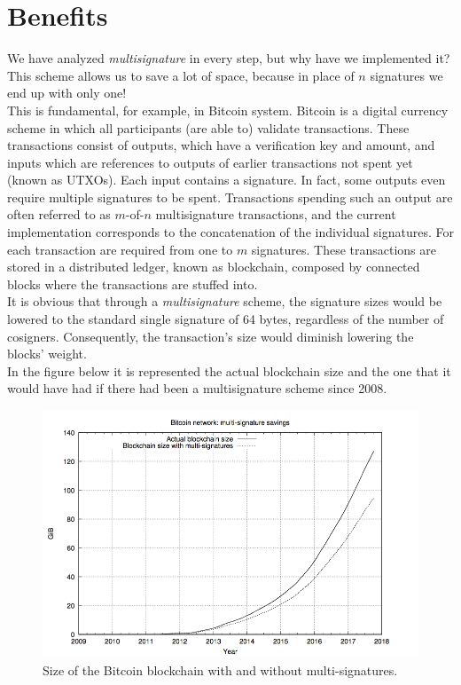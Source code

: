 \section{Benefits}
We have analyzed \textit{multisignature} in every step, but why have we implemented it?\\
This scheme allows us to save a lot of space, because in place of $n$ signatures we end up with only one!\\
This is fundamental, for example, in Bitcoin system. Bitcoin \cite{Nakamoto} is a digital currency scheme in which all participants (are able to) validate transactions. These transactions consist of outputs, which have a verification key and amount, and inputs which are references to outputs of earlier transactions not spent yet (known as UTXOs). Each input contains a signature. In fact, some outputs even require multiple signatures to be spent. Transactions spending such an output are often referred to as $m$-of-$n$ multisignature transactions, and the current implementation corresponds to the concatenation of the individual signatures. For each transaction are required from one to $m$ signatures. These transactions are stored in a distributed ledger, known as blockchain, composed by connected blocks where the transactions are stuffed into.\\
It is obvious that through a \textit{multisignature} scheme, the signature sizes would be lowered to the standard single signature of 64 bytes, regardless of the number of cosigners. Consequently, the transaction's size would diminish lowering the blocks' weight.\\
In the figure below it is represented the actual blockchain size and the one that it would have had if there had been a multisignature scheme since 2008.
\begin{figure}[H]
	\centering
	\includegraphics[width=.85\textwidth]{BlockchainMusig.png}
	\caption{Size of the Bitcoin blockchain with and without multi-signatures.}
	\label{img:BlockchainMusig}
\end{figure}